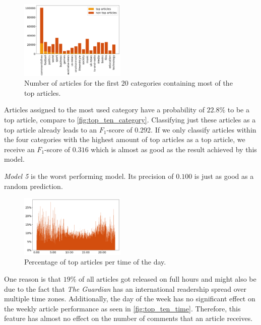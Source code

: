 \begin{figure}
	\includegraphics[width=0.45\textwidth]{fig/top_ten_category.png}
	\caption{\textmd{Number of articles for the first $20$ categories containing most of the top articles.}}
	\label{fig:top_ten_category}
\end{figure}

Articles assigned to the most used category have a probability of $22.8\%$ to be a top article, compare to \autoref{fig:top_ten_category}. Classifying just these articles as a top article already leads to an $F_1$-score of $0.292$. 
If we only classify articles within the four categories with the highest amount of top articles as a top article, we receive an $F_1$-score of $0.316$ which is almost as good as the result achieved by this model.

\textit{Model 5} is the worst performing model. Its precision of $0.100$ is just as good as a random prediction.

\begin{figure}
	\includegraphics[width=0.45\textwidth]{fig/top_ten_time.png}
	\caption{\textmd{Percentage of top articles per time of the day.}}
	\label{fig:top_ten_time}
\end{figure}

One reason is that $19\%$ of all articles got released on full hours and might also be due to the fact that \textit{The Guardian} has an international readership spread over multiple time zones. Additionally, the day of the week has no significant effect on the weekly article performance as seen in \autoref{fig:top_ten_time}. Therefore, this feature has almost no effect on the number of comments that an article receives. 

